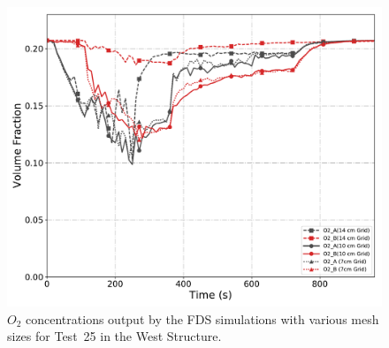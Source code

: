 \begin{figure}[!h]
	\centering
	\includegraphics[width=\columnwidth]{Figures/Plots/Grid_Sensitivity/Gas_Concentration/Test_25_O2}
	\caption[$O_2$ concentrations for West Structure simulations of various mesh sizes.]{$O_2$ concentrations output by the FDS simulations with various mesh sizes for Test~25 in the West Structure.}
	\label{fig:west_O2_sensitivity}
\end{figure}

